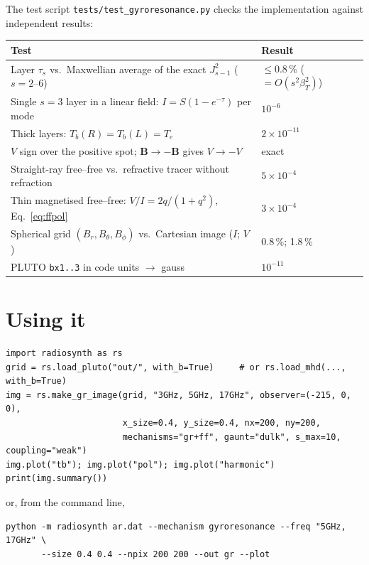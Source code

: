 \documentclass[11pt,a4paper]{article}
\newcommand{\code}[1]{\texttt{#1}}
\newcommand{\vect}[1]{\bm{#1}}
\begin{document}
The test script \code{tests/test\_gyroresonance.py} checks the implementation against
independent results:
\begin{center}
\small
\begin{tabular}{@{}p{10.5cm} l@{}}
\toprule
Test & Result \\
\midrule
Layer $\tau_s$ vs.\ Maxwellian average of the exact $J_{s-1}^2$ ($s=2$--6) & $\le0.8\,\%$ ($=O(s^2\beta_T^2)$) \\
Single $s=3$ layer in a linear field: $I=S(1-e^{-\tau})$ per mode & $10^{-6}$ \\
Thick layers: $T_b(R)=T_b(L)=T_e$ & $2\times10^{-11}$ \\
$V$ sign over the positive spot; $\vect B\to-\vect B$ gives $V\to-V$ & exact \\
Straight-ray free--free vs.\ refractive tracer without refraction & $5\times10^{-4}$ \\
Thin magnetised free--free: $V/I=2q/(1+q^2)$, Eq.~\eqref{eq:ffpol} & $3\times10^{-4}$ \\
Spherical grid $(B_r,B_\theta,B_\phi)$ vs.\ Cartesian image ($I$; $V$) & 0.8\,\%; 1.8\,\% \\
PLUTO \code{bx1..3} in code units $\to$ gauss & $10^{-11}$ \\
\bottomrule
\end{tabular}
\end{center}

\section{Using it}\label{sec:use}

\begin{small}
\begin{verbatim}
import radiosynth as rs
grid = rs.load_pluto("out/", with_b=True)     # or rs.load_mhd(..., with_b=True)
img = rs.make_gr_image(grid, "3GHz, 5GHz, 17GHz", observer=(-215, 0, 0),
                       x_size=0.4, y_size=0.4, nx=200, ny=200,
                       mechanisms="gr+ff", gaunt="dulk", s_max=10, coupling="weak")
img.plot("tb"); img.plot("pol"); img.plot("harmonic")
print(img.summary())
\end{verbatim}
\end{small}
or, from the command line,
\begin{small}
\begin{verbatim}
python -m radiosynth ar.dat --mechanism gyroresonance --freq "5GHz, 17GHz" \
       --size 0.4 0.4 --npix 200 200 --out gr --plot
\end{verbatim}
\end{small}
\end{document}
